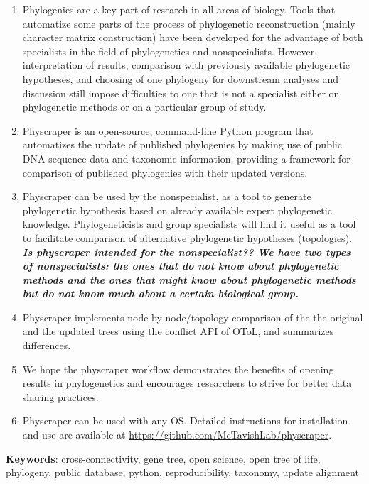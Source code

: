 \documentclass[]{article}
\begin{document}
\begin{enumerate}
\def\labelenumi{\arabic{enumi}.}
\item
  Phylogenies are a key part of research in all areas of biology. Tools that automatize
  some parts of the process of phylogenetic reconstruction (mainly character matrix construction)
  have been developed for the advantage of both specialists in the field of phylogenetics and nonspecialists.
  However, interpretation of results, comparison with previously available phylogenetic
  hypotheses, and choosing of one phylogeny for downstream analyses and discussion still impose difficulties
  to one that is not a specialist either on phylogenetic methods or on a particular group of study.
\item
  Physcraper is an open‐source, command-line Python program that automatizes the update of published
  phylogenies by making use of public DNA sequence data and taxonomic information,
  providing a framework for comparison of published phylogenies with their updated versions.
\item
  Physcraper can be used by the nonspecialist, as a tool to generate phylogenetic
  hypothesis based on already available expert phylogenetic knowledge.
  Phylogeneticists and group specialists will find it useful as a tool to facilitate comparison
  of alternative phylogenetic hypotheses (topologies).
  \textbf{\emph{Is physcraper intended for the nonspecialist?? We have two types of nonspecialists:
  the ones that do not know about phylogenetic methods and the ones that might know
  about phylogenetic methods but do not know much about a certain biological group.}}
\item
  Physcraper implements node by node/topology comparison of the the original and the updated
  trees using the conflict API of OToL, and summarizes differences.
\item
  We hope the physcraper workflow demonstrates the benefits of opening results in phylogenetics and encourages researchers to strive for better data sharing practices.
\item
  Physcraper can be used with any OS. Detailed instructions for installation and
  use are available at \url{https://github.com/McTavishLab/physcraper}.
\end{enumerate}

\textbf{Keywords}: cross-connectivity, gene tree, open science, open tree of life, phylogeny, public database, python, reproducibility, taxonomy, update alignment

\newpage
\end{document}
